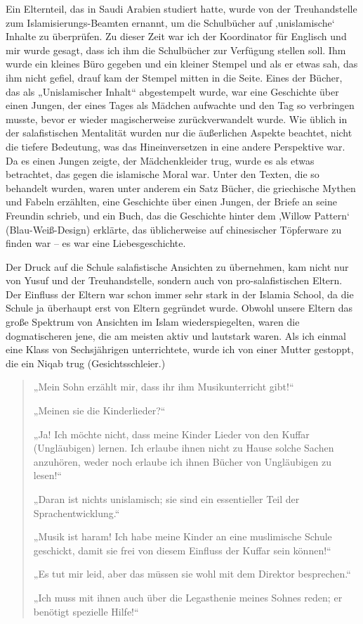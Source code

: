 \documentclass[12pt]{memoir}
\def\–{\hskip0pt-\hskip0pt}
\begin{document}
Ein Elternteil, das in Saudi Arabien studiert hatte,
wurde von der Treuhandstelle zum Islamisierungs\–Beamten ernannt,
um die Schulbücher auf ‚unislamische‘ Inhalte zu überprüfen.
Zu dieser Zeit war ich der Koordinator für Englisch
und mir wurde gesagt, dass ich ihm die Schulbücher zur Verfügung stellen soll.
Ihm wurde ein kleines Büro gegeben und ein kleiner Stempel
und als er etwas sah, das ihm nicht gefiel,
drauf kam der Stempel mitten in die Seite.
Eines der Bücher, das als „Unislamischer Inhalt“ abgestempelt wurde,
war eine Geschichte über einen Jungen,
der eines Tages als Mädchen aufwachte
und den Tag so verbringen musste,
bevor er wieder magischerweise zurückverwandelt wurde.
Wie üblich in der salafistischen Mentalität
wurden nur die äußerlichen Aspekte beachtet,
nicht die tiefere Bedeutung,
was das Hineinversetzen in eine andere Perspektive war.
Da es einen Jungen zeigte, der Mädchenkleider trug,
wurde es als etwas betrachtet, das gegen die islamische Moral war.
Unter den Texten, die so behandelt wurden,
waren unter anderem ein Satz Bücher,
die griechische Mythen und Fabeln erzählten,
eine Geschichte über einen Jungen, der Briefe an seine Freundin schrieb,
und ein Buch, das die Geschichte hinter
dem ‚Willow Pattern‘ (Blau-Weiß-Design) erklärte,
das üblicherweise auf chinesischer Töpferware zu finden war –
es war eine Liebesgeschichte.

Der Druck auf die Schule salafistische Ansichten zu übernehmen,
kam nicht nur von Yusuf und der Treuhandstelle,
sondern auch von pro-salafistischen Eltern.
Der Einfluss der Eltern war schon immer sehr stark in der Islamia School,
da die Schule ja überhaupt erst von Eltern gegründet wurde.
Obwohl unsere Eltern das große Spektrum von Ansichten im Islam wiederspiegelten,
waren die dogmatischeren jene, die am meisten aktiv und lautstark waren.
Als ich einmal eine Klass von Sechsjährigen unterrichtete,
wurde ich von einer Mutter gestoppt, die ein Niqab trug (Gesichtsschleier.)

\begin{quote}
„Mein Sohn erzählt mir, dass ihr ihm Musikunterricht gibt!“

„Meinen sie die Kinderlieder?“

„Ja! Ich möchte nicht, dass meine Kinder Lieder von den Kuffar
(Ungläubigen) lernen.
Ich erlaube ihnen nicht zu Hause solche Sachen anzuhören,
weder noch erlaube ich ihnen Bücher von Ungläubigen zu lesen!“

„Daran ist nichts unislamisch;
sie sind ein essentieller Teil der Sprachentwicklung.“

„Musik ist haram! Ich habe meine Kinder an eine muslimische Schule geschickt,
damit sie frei von diesem Einfluss der Kuffar sein können!“

„Es tut mir leid, aber das müssen sie wohl mit dem Direktor besprechen.“

„Ich muss mit ihnen auch über die Legasthenie meines Sohnes reden;
er benötigt spezielle Hilfe!“
\end{quote}
\end{document}
